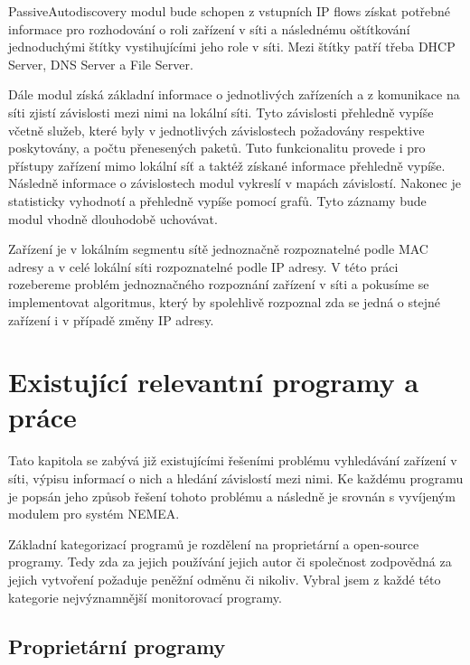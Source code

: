 \documentclass[thesis=B,czech,hidelinks]{FITthesis}[2019/03/21]
\begin{document}
PassiveAutodiscovery modul bude schopen z vstupních IP flows získat potřebné informace pro rozhodování o roli zařízení v síti a následnému oštítkování jednoduchými štítky vystihujícími jeho role v síti. Mezi štítky patří třeba DHCP Server, DNS Server a File Server. 

Dále modul získá základní informace o jednotlivých zařízeních a z komunikace na síti zjistí závislosti mezi nimi na lokální síti. Tyto závislosti přehledně vypíše včetně služeb, které byly v jednotlivých závislostech požadovány respektive poskytovány, a počtu přenesených paketů. Tuto funkcionalitu provede i pro přístupy zařízení mimo lokální síť a taktéž získané informace přehledně vypíše. Následně informace o závislostech modul vykreslí v mapách závislostí. Nakonec je statisticky vyhodnotí a přehledně vypíše pomocí grafů. Tyto záznamy bude modul vhodně dlouhodobě uchovávat.

Zařízení je v lokálním segmentu sítě jednoznačně rozpoznatelné podle MAC adresy a v celé lokální síti rozpoznatelné podle IP adresy. V této práci rozebereme problém jednoznačného rozpoznání zařízení v síti a pokusíme se implementovat algoritmus, který by spolehlivě rozpoznal zda se jedná o stejné zařízení i v případě změny IP adresy.




\chapter{Existující relevantní programy a práce}
Tato kapitola se zabývá již existujícími řešeními problému vyhledávání zařízení v síti, výpisu informací o nich a hledání závislostí mezi nimi. Ke každému programu je popsán jeho způsob řešení tohoto problému a následně je srovnán s vyvíjeným modulem pro systém NEMEA.

Základní kategorizací programů je rozdělení na proprietární a open-source programy. Tedy zda za jejich používání jejich autor či společnost zodpovědná za jejich vytvoření požaduje peněžní odměnu či nikoliv. Vybral jsem z každé této kategorie nejvýznamnější monitorovací programy. 
    \section{Proprietární programy}
\end{document}
